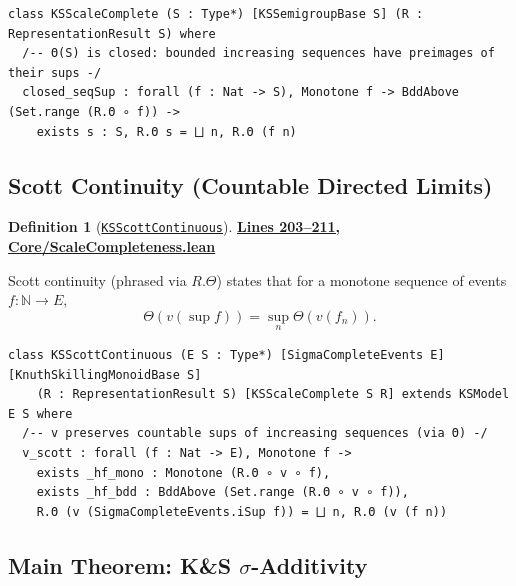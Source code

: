 \documentclass[11pt]{article}
\theoremstyle{definition}
\newtheorem{definition}[theorem]{Definition}
\theoremstyle{remark}
\begin{document}
\begin{lstlisting}[caption={Scale completeness (sequential closure)}]
class KSScaleComplete (S : Type*) [KSSemigroupBase S] (R : RepresentationResult S) where
  /-- Θ(S) is closed: bounded increasing sequences have preimages of their sups -/
  closed_seqSup : forall (f : Nat -> S), Monotone f -> BddAbove (Set.range (R.Θ ∘ f)) ->
    exists s : S, R.Θ s = ⨆ n, R.Θ (f n)
\end{lstlisting}

\subsection{Scott Continuity (Countable Directed Limits)}

\begin{definition}[\href{https://github.com/zariuq/ks-foundations-of-inference/blob/main/KnuthSkilling/Core/ScaleCompleteness.lean\#L203}{\texttt{KSScottContinuous}}]
\textbf{\href{https://github.com/zariuq/ks-foundations-of-inference/blob/main/KnuthSkilling/Core/ScaleCompleteness.lean\#L203-L211}{Lines 203--211, Core/ScaleCompleteness.lean}}

Scott continuity (phrased via $R.\Theta$) states that for a monotone sequence of events $f : \mathbb{N} \to E$,
\[
\Theta(v(\sup f)) = \sup_n \Theta(v(f_n)).
\]
\end{definition}

\begin{lstlisting}[caption={Scott continuity for valuations}]
class KSScottContinuous (E S : Type*) [SigmaCompleteEvents E] [KnuthSkillingMonoidBase S]
    (R : RepresentationResult S) [KSScaleComplete S R] extends KSModel E S where
  /-- v preserves countable sups of increasing sequences (via Θ) -/
  v_scott : forall (f : Nat -> E), Monotone f ->
    exists _hf_mono : Monotone (R.Θ ∘ v ∘ f),
    exists _hf_bdd : BddAbove (Set.range (R.Θ ∘ v ∘ f)),
    R.Θ (v (SigmaCompleteEvents.iSup f)) = ⨆ n, R.Θ (v (f n))
\end{lstlisting}

\subsection{Main Theorem: K\&S $\sigma$-Additivity}
\end{document}
